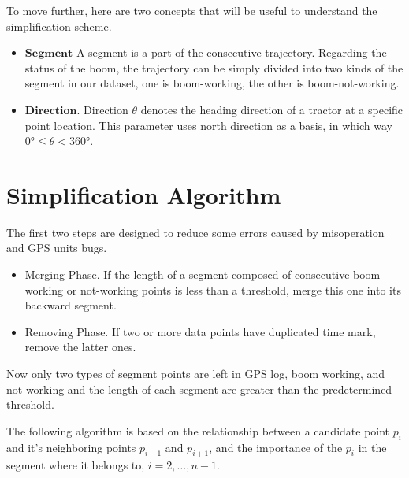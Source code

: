 To move further, here are two concepts that will be useful to understand the simplification scheme.
\begin{itemize}
\item $\mathbf{Segment}$ A segment is a part of the consecutive trajectory. Regarding the status of the boom, the trajectory can be simply divided into two kinds of the segment in our dataset, one is boom-working, the other is boom-not-working. 
\item $\mathbf{Direction}$. Direction $\theta$ denotes the heading direction of a tractor at a specific point location. This parameter uses north direction as a basis, in which way $\ang{0} \leq \theta < \ang{360}$.
\end{itemize}



\section{Simplification Algorithm}

The first two steps are designed to reduce some errors caused by misoperation and GPS units bugs.
\begin{itemize}
\item Merging Phase. If the length of a segment composed of consecutive boom working or not-working points is less than a threshold, merge this one into its backward segment. 
\item Removing Phase. If two or more data points have duplicated time mark, remove the latter ones. 
\end{itemize}
Now only two types of segment points are left in GPS log, boom working, and not-working and the length of each segment are greater than the predetermined threshold.

The following algorithm is based on the relationship between a candidate point $p_i$ and it's neighboring points $p_{i-1}$ and $p_{i+1}$, and the importance of the $p_i$ in the segment where it belongs to, $i=2,\ldots,n-1$. 

